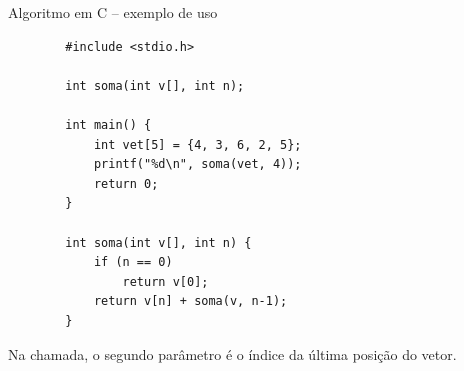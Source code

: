 \documentclass[handout]{beamer}
\begin{document}
\begin{frame}[fragile]{Algoritmo em C -- exemplo de uso}

    \begin{verbatim}
        #include <stdio.h>

        int soma(int v[], int n);

        int main() {
            int vet[5] = {4, 3, 6, 2, 5};
            printf("%d\n", soma(vet, 4));
            return 0;
        }

        int soma(int v[], int n) {
            if (n == 0)
                return v[0];
            return v[n] + soma(v, n-1);
        }
    \end{verbatim}

    \small
    Na chamada, o segundo parâmetro é o índice da última posição do vetor.

\end{frame}
\end{document}
